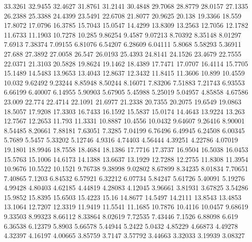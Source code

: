 33.3261      32.9455      32.4627      31.8761      31.2141      30.4848      29.7068      28.8779      28.0157      27.1335      26.2388      25.3388      24.4399      23.5491      22.6708      21.8077      20.9625      20.138      19.3366      18.559      17.8072      17.0796      16.3785      15.7043      15.0547      14.4299      13.8309      13.2563      12.7056      12.1782      11.6733      11.1903      10.7278      10.285      9.86254      9.4587      9.07213      8.70392      8.35148      8.01297      7.6913      7.38374      7.09155      6.81076      6.54207      6.28609      6.04111      5.8068      5.58293      5.36911      
27.688      27.3892      27.0058      26.547      26.0193      25.4393      24.8141      24.1526      23.4679      22.7555      22.0371      21.3103      20.5828      19.8624      19.1462      18.4389      17.7471      17.0707      16.4114      15.7705      15.1489      14.5483      13.9653      13.4043      12.8637      12.3432      11.8415      11.3606      10.899      10.4559      10.032      9.62492      9.23244      8.85948      8.50244      8.16071      7.83206      7.51883      7.21743      6.93553      6.66199      6.40007      6.14955      5.90903      5.67905      5.45988      5.25019      5.04957      4.85858      4.67586      
23.009      22.774      22.4714      22.1091      21.6977      21.2338      20.7355      20.2075      19.6549      19.0863      18.5057      17.9208      17.3303      16.7433      16.1592      15.5837      15.0174      14.4643      13.9224      13.263      12.7567      12.2653      11.793      11.3331      10.8887      10.4556      10.0432      9.64607      9.26416      8.90001      8.54485      8.20661      7.88181      7.63051      7.3285      7.04199      6.76496      6.49945      6.24508      6.00345      5.7689      5.5457      5.33202      5.12746      4.9316      4.74403      4.56444      4.39251      4.22786      4.07019      
19.1801      18.9946      18.7558      18.4684      18.1386      17.7716      17.3737      16.9504      16.5038      16.0453      15.5763      15.1006      14.6173      14.1388      13.6637      13.1929      12.7288      12.2755      11.8308      11.3954      10.9676      10.5522      10.1521      9.76738      9.38998      9.02802      8.67899      8.34235      8.01834      7.70651      7.40865      7.1203      6.84532      6.57921      6.32212      6.07734      5.84247      5.61726      5.40091      5.19276      4.99428      4.80403      4.62185      4.44819      4.28083      4.12045      3.96661      3.81931      3.67825      3.54286      
15.9852      15.8395      15.6503      15.4223      15.16      14.8677      14.5497      14.2111      13.8543      13.4853      13.1064      12.7207      12.3319      11.9419      11.5541      11.1685      10.7876      10.4116      10.0457      9.68619      9.33503      8.99323      8.66112      8.33864      8.02619      7.72535      7.43446      7.1526      6.88098      6.619      6.36538      6.12379      5.8903      5.66578      5.44944      5.2422      5.0432      4.85229      4.66873      4.49278      4.32397      4.16197      4.00665      3.85759      3.7147      3.57792      3.44663      3.32033      3.19939      3.08327      
